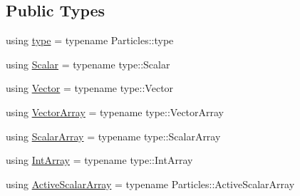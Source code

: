 \subsection*{Public Types}
\begin{DoxyCompactItemize}
\item 
using \mbox{\hyperlink{classparticle_system_a7919ed2c8b419f26da20a3bd43ba5fcd}{type}} = typename Particles\+::type
\item 
using \mbox{\hyperlink{classparticle_system_a3938954186247e3eab01cc75fcc62b40}{Scalar}} = typename type\+::\+Scalar
\item 
using \mbox{\hyperlink{classparticle_system_a76c99c2b05db108a24c6e6ccbbd93af1}{Vector}} = typename type\+::\+Vector
\item 
using \mbox{\hyperlink{classparticle_system_ac8049667a0d05e76b836642503a71c12}{Vector\+Array}} = typename type\+::\+Vector\+Array
\item 
using \mbox{\hyperlink{classparticle_system_a7f143d2466bd0f78d79cccd3493a756b}{Scalar\+Array}} = typename type\+::\+Scalar\+Array
\item 
using \mbox{\hyperlink{classparticle_system_aea9c70dc1a9d1947b425f5383fb21e24}{Int\+Array}} = typename type\+::\+Int\+Array
\item 
using \mbox{\hyperlink{classparticle_system_adeaa416917733980026d138dfde2f7ab}{Active\+Scalar\+Array}} = typename Particles\+::\+Active\+Scalar\+Array
\end{DoxyCompactItemize}
